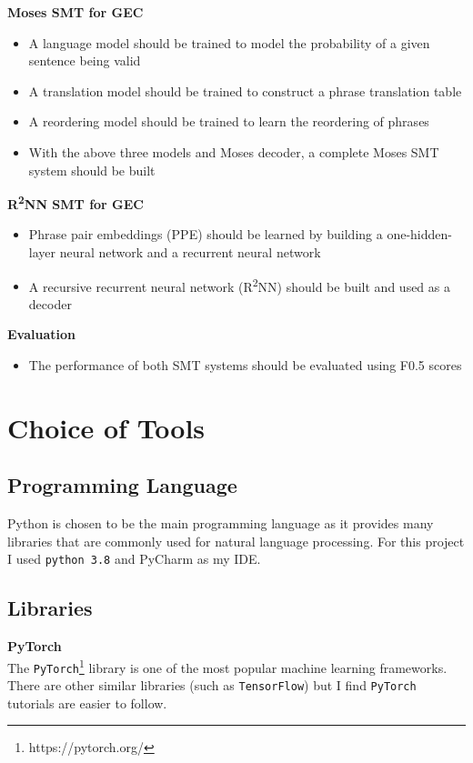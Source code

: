 \documentclass[12pt,a4paper,twoside,openright]{report}
\begin{document}
\textbf{Moses SMT for GEC}
\begin{itemize}
    \item A language model should be trained to model the probability of a given sentence being valid
    \item A translation model should be trained to construct a phrase translation table
    \item A reordering model should be trained to learn the reordering of phrases
    \item With the above three models and Moses decoder, a complete Moses SMT system should be built
\end{itemize}

\textbf{R\textsuperscript{2}NN SMT for GEC}

\begin{itemize}
    \item Phrase pair embeddings (PPE) should be learned by building a one-hidden-layer neural network and a recurrent neural network
    \item A recursive recurrent neural network (R\textsuperscript{2}NN) should be built and used as a decoder
\end{itemize}

\textbf{Evaluation}
\begin{itemize}
    \item The performance of both SMT systems should be evaluated using F0.5 scores
\end{itemize}

\section{Choice of Tools}\label{section:tools}

\subsection{Programming Language}
Python is chosen to be the main programming language as it provides many libraries that are commonly used for natural language processing. For this project I used \texttt{python 3.8} and PyCharm as my IDE.

\subsection{Libraries}
\textbf{PyTorch} \\
The \texttt{PyTorch}\footnote{https://pytorch.org/} library is one of the most popular machine learning frameworks. There are other similar libraries (such as \texttt{TensorFlow}) but I find \texttt{PyTorch} tutorials are easier to follow.
\end{document}

